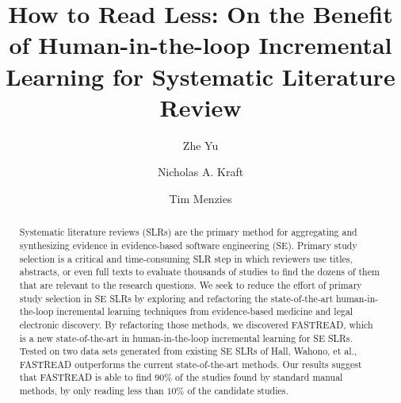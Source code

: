 \documentclass{svjour3}
\theoremstyle{break}
\begin{document}
\title{How to Read Less: On the Benefit of Human-in-the-loop Incremental Learning for Systematic Literature Review%
}



\author{Zhe Yu         \and
        Nicholas A. Kraft \and 
        Tim Menzies%
}




\maketitle

\begin{abstract}
  
Systematic literature reviews (SLRs) are the primary method for aggregating and synthesizing evidence in evidence-based software engineering (SE). Primary study selection is a critical and time-consuming SLR step in which reviewers use
titles, abstracts, or even full texts to evaluate thousands of studies to find the dozens of them that are relevant to the research questions. We seek to reduce the effort of primary study selection in SE SLRs by exploring and refactoring the state-of-the-art human-in-the-loop incremental learning techniques from evidence-based medicine and legal electronic discovery. By refactoring those methods, we discovered FASTREAD, which is a new state-of-the-art in human-in-the-loop incremental learning for SE SLRs. Tested on two data sets generated from existing SE SLRs of Hall, Wahono, et al., FASTREAD outperforms the current state-of-the-art methods. Our results suggest that FASTREAD is able to find $90\%$ of the studies found by standard manual methods, by only reading less than $10\%$ of the candidate studies.


\end{abstract}
\end{document}
